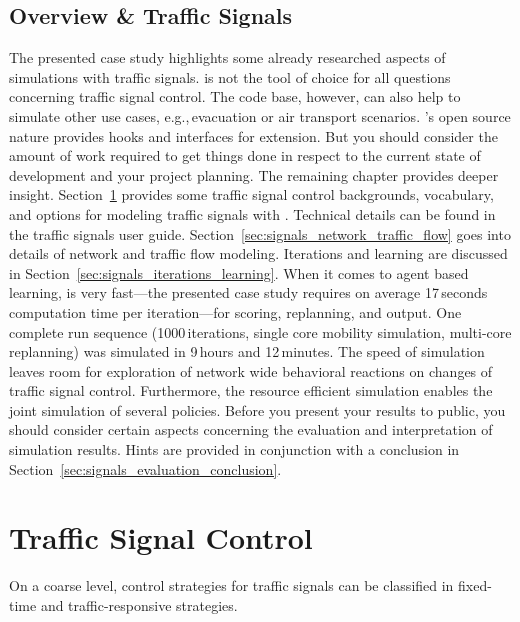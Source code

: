 \subsection{Overview  \& Traffic Signals}
The presented case study highlights some already researched aspects of  simulations with traffic signals. 
 is not the tool of choice for all questions concerning traffic signal control. 
The code base, however, can also help to simulate other use cases, e.g.,\,evacuation or air transport scenarios. 
's open source nature provides hooks and interfaces for extension. 
But you should consider the amount of work required to get things done in respect to the current state of development and your project planning. 
The remaining chapter provides deeper insight.  
Section~\ref{sec:signals_traffic_signal_control} provides some traffic signal control backgrounds, vocabulary, and options for modeling traffic signals with . 
Technical details can be found in the traffic signals user guide.  
Section~\ref{sec:signals_network_traffic_flow} goes into details of network and traffic flow modeling. 
Iterations and learning are discussed in Section~\ref{sec:signals_iterations_learning}. 
When it comes to agent based learning,  is very fast---the presented case study requires on average 17\,seconds computation time per iteration---for scoring, replanning, and output. One complete run sequence (1000\,iterations, single core mobility simulation, multi-core replanning) was simulated in 9\,hours and 12\,minutes. 
The speed of simulation leaves room for exploration of network wide behavioral reactions on changes of traffic signal control. 
Furthermore, the resource efficient simulation enables the joint simulation of several policies. 
Before you present your results to public, you should consider certain aspects concerning the  evaluation and interpretation of simulation results. 
Hints are provided in conjunction with a conclusion in Section~\ref{sec:signals_evaluation_conclusion}. 

\section{Traffic Signal Control}
\label{sec:signals_traffic_signal_control}
On a coarse level, control strategies for traffic signals can be classified in fixed-time and traffic-responsive strategies. 

